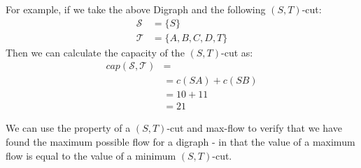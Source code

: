 For example, if we take the above Digraph and the following $(S, T)$-cut:
\begin{align*}
    \mathcal{S} &= \{S\}\\
    \mathcal{T} &= \{A, B, C, D, T\}
\end{align*}
Then we can calculate the capacity of the $(S, T)$-cut as:
\begin{align*}
    cap(\mathcal{S}, \mathcal{T}) &=\\
    &= c(SA) + c(SB) \\
    &= 10 + 11 \\
    &= 21
\end{align*}

We can use the property of a $(S, T)$-cut and max-flow to verify that we have found the maximum possible flow for a digraph - in that the value of a maximum flow is equal to the value of a minimum $(S, T)$-cut. 
